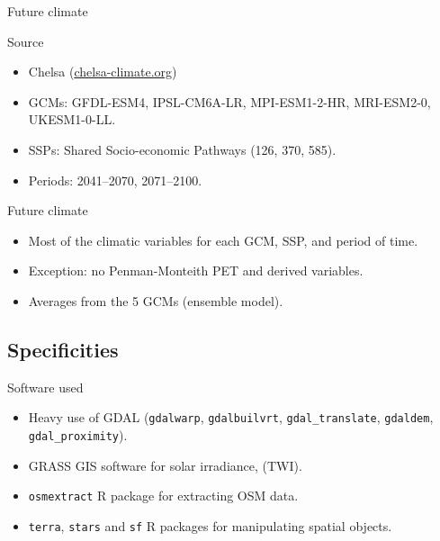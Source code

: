 \documentclass[10pt,table,dvipsnames,compress]{beamer}
\begin{document}
\begin{frame}[label={sec:orgc5ba901}]{Future climate}
\begin{block}{Source}
\begin{itemize}
\item Chelsa (\href{https://chelsa-climate.org)}{chelsa-climate.org})
\item GCMs: GFDL-ESM4, IPSL-CM6A-LR, MPI-ESM1-2-HR, MRI-ESM2-0, UKESM1-0-LL.
\item SSPs: Shared Socio-economic Pathways (126, 370, 585).
\item Periods: 2041--2070, 2071--2100.
\end{itemize}
\end{block}

\begin{block}{Future climate}
\begin{itemize}
\item Most of the climatic variables for each GCM, SSP, and period of time.
\item Exception: no Penman-Monteith PET and derived variables.
\item Averages from the 5 GCMs (ensemble model).
\end{itemize}
\end{block}
\end{frame}

\subsection{Specificities}
\label{sec:org7434ef9}

\begin{frame}[label={sec:org9dfe15d},fragile]{Software used}
 \begin{itemize}
\item Heavy use of GDAL (\texttt{gdalwarp}, \texttt{gdalbuilvrt}, \texttt{gdal\_translate}, \texttt{gdaldem}, \texttt{gdal\_proximity}).
\item GRASS GIS software for solar irradiance, (TWI).
\item \texttt{osmextract} R package for extracting OSM data.
\item \texttt{terra}, \texttt{stars} and \texttt{sf} R packages for manipulating spatial objects.
\end{itemize}
\end{frame}
\end{document}
